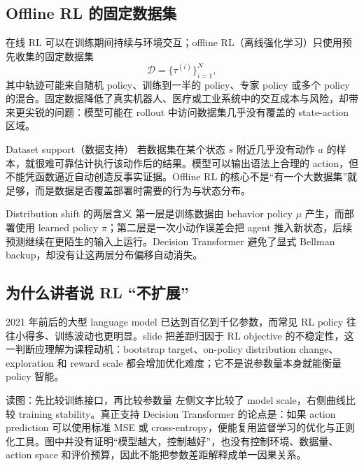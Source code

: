 \subsection{Offline RL 的固定数据集}

在线 RL 可以在训练期间持续与环境交互；offline RL（离线强化学习）只使用预先收集的固定数据集
\[
\mathcal{D}=\{\tau^{(i)}\}_{i=1}^{N},
\]
其中轨迹可能来自随机 policy、训练到一半的 policy、专家 policy 或多个 policy 的混合。固定数据降低了真实机器人、医疗或工业系统中的交互成本与风险，却带来更尖锐的问题：模型可能在 rollout 中访问数据集几乎没有覆盖的 state-action 区域。


\begin{importantbox}{Dataset support（数据支持）}
若数据集在某个状态 $s$ 附近几乎没有动作 $a$ 的样本，就很难可靠估计执行该动作后的结果。模型可以输出语法上合理的 action，但不能凭函数逼近自动创造反事实证据。Offline RL 的核心不是“有一个大数据集”就足够，而是数据是否覆盖部署时需要的行为与状态分布。
\end{importantbox}

\begin{warningbox}{Distribution shift 的两层含义}
第一层是训练数据由 behavior policy $\mu$ 产生，而部署使用 learned policy $\pi$；第二层是一次小动作误差会把 agent 推入新状态，后续预测继续在更陌生的输入上运行。Decision Transformer 避免了显式 Bellman backup，却没有让这两层分布偏移自动消失。
\end{warningbox}

\subsection{为什么讲者说 RL “不扩展”}

2021 年前后的大型 language model 已达到百亿到千亿参数，而常见 RL policy 往往小得多、训练波动也更明显。slide 把差距归因于 RL objective 的不稳定性，这一判断应理解为课程动机：bootstrap target、on-policy distribution change、exploration 和 reward scale 都会增加优化难度；它不是说参数量本身就能衡量 policy 智能。


\begin{knowledgebox}{读图：先比较训练接口，再比较参数量}
左侧文字比较了 model scale，右侧曲线比较 training stability。真正支持 Decision Transformer 的论点是：如果 action prediction 可以使用标准 MSE 或 cross-entropy，便能复用监督学习的优化与正则化工具。图中并没有证明“模型越大，控制越好”，也没有控制环境、数据量、action space 和评价预算，因此不能把参数差距解释成单一因果关系。
\end{knowledgebox}

